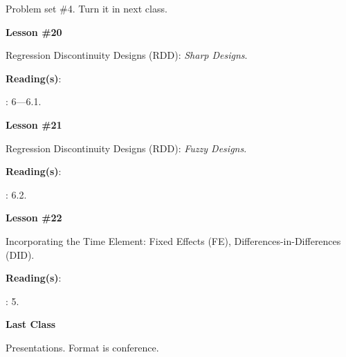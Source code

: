 \documentclass[letterpaper]{article}
\renewenvironment{itemize}{
  \begin{list}{}{
    \setlength{\leftmargin}{1.5em}
  }
}{
  \end{list}
}
\begin{document}
\begin{enumerate}
\item[{\color{red}\Pointinghand}] Problem set \#4. Turn it in next class.


      \begin{itemize} 
        \item[$\bullet$] {\bf Lesson \#20}
          \begin{itemize} 
            \item[$\circ$] Regression Discontinuity Designs (RDD): \emph{Sharp Designs}.
            \item[$\circ$] {\bf Reading(s)}: 
              \begin{itemize}
                \item[$\diamond$] \textcite{Angrist2009}: 6---6.1.
              \end{itemize}
          \end{itemize}
      \end{itemize}


      \begin{itemize} 
        \item[$\bullet$] {\bf Lesson \#21}
          \begin{itemize} 
            \item[$\circ$] Regression Discontinuity Designs (RDD): \emph{Fuzzy Designs}.
            \item[$\circ$] {\bf Reading(s)}: 
              \begin{itemize}
                \item[$\diamond$] \textcite{Angrist2009}: 6.2.
              \end{itemize}
          \end{itemize}
      \end{itemize}


      \begin{itemize} 
        \item[$\bullet$] {\bf Lesson \#22}
          \begin{itemize} 
            \item[$\circ$] Incorporating the Time Element: Fixed Effects (FE), Differences-in-Differences (DID).
            \item[$\circ$] {\bf Reading(s)}: 
              \begin{itemize}
                \item[$\diamond$] \textcite{Angrist2009}: 5.
              \end{itemize}
          \end{itemize}
      \end{itemize}



      \begin{itemize} 
        \item[$\bullet$] {\bf Last Class}
          \begin{itemize} 
            \item[$\circ$] Presentations. Format is conference.
        \end{itemize}
      \end{itemize}


			

\end{enumerate}


\newpage
{}
\setcounter{page}{1}
\printbibliography
\end{document}
